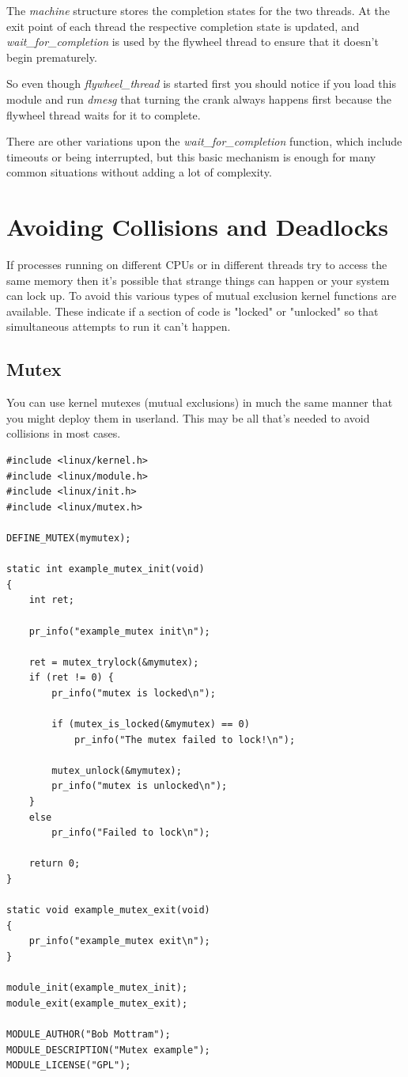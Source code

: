 \documentclass[11pt]{article}
\begin{document}
The \emph{machine} structure stores the completion states for the two threads. At the exit point of each thread the respective completion state is updated, and \emph{wait\_for\_completion} is used by the flywheel thread to ensure that it doesn't begin prematurely.

So even though \emph{flywheel\_thread} is started first you should notice if you load this module and run \emph{dmesg} that turning the crank always happens first because the flywheel thread waits for it to complete.

There are other variations upon the \emph{wait\_for\_completion} function, which include timeouts or being interrupted, but this basic mechanism is enough for many common situations without adding a lot of complexity.

\section*{Avoiding Collisions and Deadlocks}
\label{sec-12}
If processes running on different CPUs or in different threads try to access the same memory then it's possible that strange things can happen or your system can lock up. To avoid this various types of mutual exclusion kernel functions are available. These indicate if a section of code is "locked" or "unlocked" so that simultaneous attempts to run it can't happen.
\subsection*{Mutex}
\label{sec-12-1}
You can use kernel mutexes (mutual exclusions) in much the same manner that you might deploy them in userland. This may be all that's needed to avoid collisions in most cases.

\begin{verbatim}
#include <linux/kernel.h>
#include <linux/module.h>
#include <linux/init.h>
#include <linux/mutex.h>

DEFINE_MUTEX(mymutex);

static int example_mutex_init(void)
{
    int ret;

    pr_info("example_mutex init\n");

    ret = mutex_trylock(&mymutex);
    if (ret != 0) {
        pr_info("mutex is locked\n");

        if (mutex_is_locked(&mymutex) == 0)
            pr_info("The mutex failed to lock!\n");

        mutex_unlock(&mymutex);
        pr_info("mutex is unlocked\n");
    }
    else
        pr_info("Failed to lock\n");

    return 0;
}

static void example_mutex_exit(void)
{
    pr_info("example_mutex exit\n");
}

module_init(example_mutex_init);
module_exit(example_mutex_exit);

MODULE_AUTHOR("Bob Mottram");
MODULE_DESCRIPTION("Mutex example");
MODULE_LICENSE("GPL");
\end{verbatim}
\end{document}
